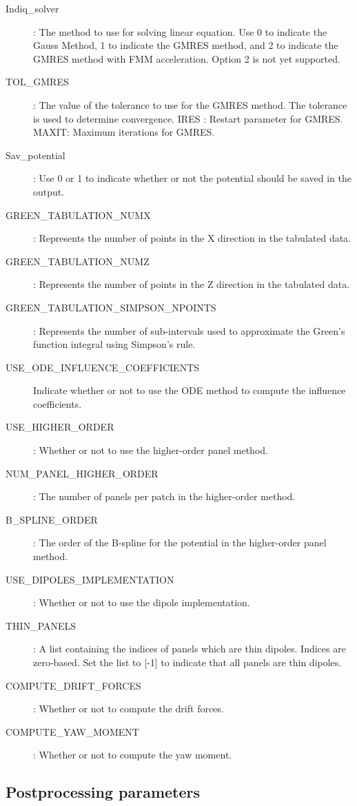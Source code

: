 \documentclass[12pt]{article}
\begin{document}
\begin{description}
\item [Indiq{\_}solver]: The method to use for solving linear equation. Use 0 to indicate the Gauss Method, 1 to indicate the GMRES method, and 2 to indicate the GMRES method with FMM acceleration. Option 2 is not yet supported.
\item [TOL_GMRES] : The value of the tolerance to use for the GMRES method. The tolerance is used to determine convergence.
IRES : Restart parameter for GMRES. MAXIT: Maximum iterations for GMRES.
\item [Sav_potential] : Use 0 or 1 to indicate whether or not the potential should be saved in the output.

\item [GREEN_TABULATION_NUMX] : Represents the number of points in the X direction in the tabulated data.
\item [GREEN_TABULATION_NUMZ]: Represents the number of points in the Z direction in the tabulated data.
\item [GREEN_TABULATION_SIMPSON_NPOINTS]: Represents the number of sub-intervals used to approximate the Green's function integral using Simpson's rule.
\item [USE_ODE_INFLUENCE_COEFFICIENTS] Indicate whether or not to use the ODE method to compute the influence coefficients.
\item [USE_HIGHER_ORDER]: Whether or not to use the higher-order panel method. 
\item [NUM_PANEL_HIGHER_ORDER]: The number of panels per patch in the higher-order
method.
\item [B_SPLINE_ORDER]: The order of the B-spline for the potential in the higher-order panel method.
\item [USE_DIPOLES_IMPLEMENTATION]: Whether or not to use the dipole implementation. 
\item [THIN_PANELS]: A list containing the indices of panels which are thin dipoles. Indices
are zero-based. Set the list to [-1] to indicate that all panels are thin dipoles. 
\item [COMPUTE_DRIFT_FORCES]: Whether or not to compute the drift forces. 
\item [COMPUTE_YAW_MOMENT]: Whether or not to compute the yaw moment.
\end{description}


\subsection{Postprocessing parameters}
\end{document}
